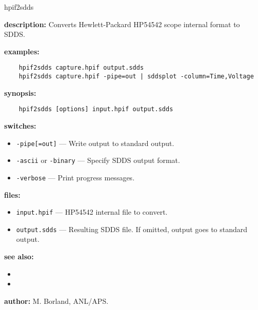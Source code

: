 \begin{sddsprog}{hpif2sdds}
  \item \textbf{description:} Converts Hewlett-Packard HP54542 scope internal format to SDDS.
  \item \textbf{examples:}
    \begin{verbatim}
    hpif2sdds capture.hpif output.sdds
    hpif2sdds capture.hpif -pipe=out | sddsplot -column=Time,Voltage
    \end{verbatim}
  \item \textbf{synopsis:}
    \begin{verbatim}
    hpif2sdds [options] input.hpif output.sdds
    \end{verbatim}
  \item \textbf{switches:}
    \begin{itemize}
    \item \verb|-pipe[=out]| --- Write output to standard output.
    \item \verb|-ascii| or \verb|-binary| --- Specify SDDS output format.
    \item \verb|-verbose| --- Print progress messages.
    \end{itemize}
  \item \textbf{files:}
    \begin{itemize}
    \item \verb|input.hpif| --- HP54542 internal file to convert.
    \item \verb|output.sdds| --- Resulting SDDS file. If omitted, output goes to standard output.
    \end{itemize}
  \item \textbf{see also:}
    \begin{itemize}
    \item {}
    \item {}
    \end{itemize}
  \item \textbf{author:} M. Borland, ANL/APS.
\end{sddsprog}

